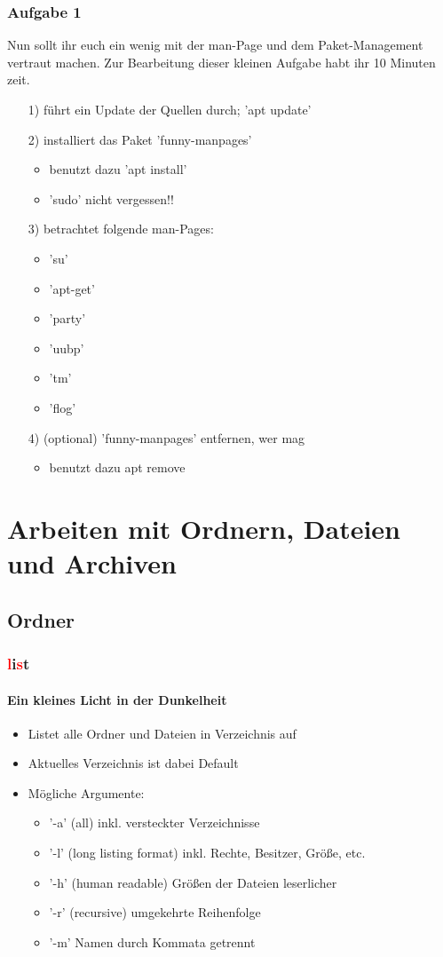 \documentclass[12pt,utf8, handout]{beamer}
\begin{document}
\begin{frame}
\frametitle{Aufgabe 1}
Nun sollt ihr euch ein wenig mit der man-Page und dem Paket-Management vertraut machen. Zur Bearbeitung dieser kleinen Aufgabe habt ihr 10 Minuten zeit.
\begin{itemize}
	\item[1)] führt ein Update der Quellen durch; 'apt update'
	\item[2)] installiert das Paket 'funny-manpages'
	\begin{itemize}
		\item benutzt dazu 'apt install'
		\item 'sudo' nicht vergessen!!
	\end{itemize}
	\item[3)] betrachtet folgende man-Pages:
	\begin{itemize}
		\item 'su'
		\item 'apt-get'
		\item 'party'
		\item 'uubp'
		\item 'tm'
		\item 'flog'
	\end{itemize}
	\item[4)] (optional) 'funny-manpages' entfernen, wer mag
	\begin{itemize}
		\item benutzt dazu apt remove
	\end{itemize}
\end{itemize} 
\end{frame}

\section{Arbeiten mit Ordnern, Dateien und Archiven}
\subsection{Ordner}
\begin{frame}
\frametitle{\textcolor{red}{l}i\textcolor{red}{s}t}
\framesubtitle{Ein kleines Licht in der Dunkelheit}
\begin{itemize}
	\item Listet alle Ordner und Dateien in Verzeichnis auf
	\item Aktuelles Verzeichnis ist dabei Default
	\item Mögliche Argumente:
	\begin{itemize}[<+->]
		\item '-a'  (all) inkl. versteckter Verzeichnisse
		\item '-l'  (long listing format) inkl. Rechte, Besitzer, Größe, etc.
		\item '-h'  (human readable) Größen der Dateien leserlicher
		\item '-r'  (recursive) umgekehrte Reihenfolge
		\item '-m'  Namen durch Kommata getrennt
	\end{itemize}
\end{itemize}
\end{frame}
\end{document}
